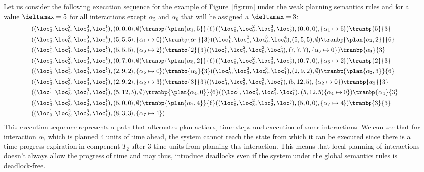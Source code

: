 \begin{example}
  \label{exp:dl}
  Let us consider the following execution sequence for the example of Figure~\ref{fig:run} under the weak planning semantics rules and 
  for a value $\deltamax=5$ for all interactions except $\alpha_5$ and $\alpha_6$ that will be assigned a $\deltamax=3$:
      \begin{displaymath}
        \small{
        \begin{split}
          &((\loc_0^1,\loc_0^2,\loc_0^3,\loc_0^4),(0,0,0),\emptyset)\tranbp{\plan{\alpha_1,5}}{6}((\loc_0^1,\loc_0^2,\loc_0^3,\loc_0^4),(0,0,0),\{\alpha_1\mapsto5\})\tranbp{5}{3}\\&
          ((\loc_0^1,\loc_0^2,\loc_0^3,\loc_0^4),(5,5,5),\{\alpha_1\mapsto0\})\tranbp{\alpha_1}{3}((\loc_1^1,\loc_1^2,\loc_0^3,\loc_0^4),(5,5,5),\emptyset)\tranbp{\plan{\alpha_3,2}}{6}
          \\&((\loc_1^1,\loc_1^2,\loc_0^3,\loc_0^4),(5,5,5),\{\alpha_3\mapsto2\})\tranbp{2}{3}((\loc_1^1,\loc_1^2,\loc_0^3,\loc_0^4),(7,7,7),\{\alpha_3\mapsto0\})\tranbp{\alpha_3}{3}
          \\&((\loc_0^1,\loc_2^2,\loc_0^3,\loc_0^4),(0,7,0),\emptyset)\tranbp{\plan{\alpha_5,2}}{6}((\loc_0^1,\loc_2^2,\loc_0^3,\loc_0^4),(0,7,0),\{\alpha_5\mapsto2\})\tranbp{2}{3}
          \\&((\loc_0^1,\loc_2^2,\loc_0^3,\loc_0^4),(2,9,2),\{\alpha_5\mapsto0\})\tranbp{\alpha_5}{3}((\loc_0^1,\loc_3^2,\loc_0^3,\loc_1^4),(2,9,2),\emptyset)\tranbp{\plan{\alpha_2,3}}{6}\\
            &((\loc_0^1,\loc_3^2,\loc_0^3,\loc_1^4),(2,9,2),\{\alpha_2\mapsto3\})\tranbp{3}{3}((\loc_0^1,\loc_3^2,\loc_0^3,\loc_1^4),(5,12,5),\{\alpha_2\mapsto0\})\tranbp{\alpha_2}{3}\\
            &((\loc_1^1,\loc_3^2,\loc_1^3,\loc_1^4),(5,12,5),\emptyset)\tranbp{\plan{\alpha_4,0}}{6}((\loc_1^1,\loc_3^2,\loc_1^3,\loc_1^4),(5,12,5)\{\alpha_4\mapsto0\})\tranbp{\alpha_4}{3}\\
            &((\loc_0^1,\loc_3^2,\loc_2^3,\loc_1^4),(5,0,0),\emptyset)\tranbp{\plan{\alpha_7,4}}{6}((\loc_0^1,\loc_3^2,\loc_2^3,\loc_1^4),(5,0,0),\{\alpha_7\mapsto4\})\tranbp{3}{3}\\
            &((\loc_0^1,\loc_3^2,\loc_2^3,\loc_1^4),(8,3,3),\{\alpha_7\mapsto1\})
        \end{split}
      }
      \end{displaymath}
This execution sequence represents a path that alternates plan actions, time steps and execution of some interactions. We can see that for interaction
$\alpha_7$ which is planned 4 units of time ahead, the system cannot reach the state from which it can be executed since there is a time progress expiration
in component $T_2$ after 3 time units from planning this interaction. This means that local planning of interactions doesn't always allow the progress of time and may
thus, introduce deadlocks even if the system under the global semantics rules is deadlock-free. 
      
\end{example}

